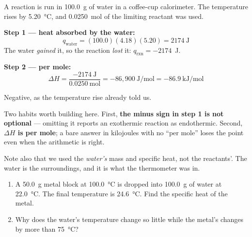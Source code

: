 \documentclass{apchem-notes}
\begin{document}
\begin{workedexample}
A reaction is run in \SI{100.0}{\gram} of water in a coffee-cup
calorimeter. The temperature rises by \SI{5.20}{\celsius}, and
\SI{0.0250}{\mole} of the limiting reactant was used.

\textbf{Step 1 --- heat absorbed by the water:}
\[ q_{\text{water}} = (100.0)(4.18)(5.20) = 2174~\text{J} \]
The water \emph{gained} it, so the reaction \emph{lost} it:
$q_{\text{rxn}} = -2174$~J.

\textbf{Step 2 --- per mole:}
\[ \Delta H = \frac{-2174~\text{J}}{0.0250~\text{mol}}
   = -86{,}900~\si{\joule\per\mole} =
   \mathbf{-86.9}~\si{\kilo\joule\per\mole} \]

Negative, as the temperature rise already told us.
\end{workedexample}

\begin{apctrap}
Two habits worth building here. First, \textbf{the minus sign in step 1 is
not optional} --- omitting it reports an exothermic reaction as
endothermic. Second, \textbf{$\Delta H$ is per mole}; a bare answer in
kilojoules with no ``per mole'' loses the point even when the arithmetic is
right.

Note also that we used the \emph{water's} mass and specific heat, not the
reactants'. The water is the surroundings, and it is what the thermometer
was in.
\end{apctrap}


\begin{enumerate}[leftmargin=*,itemsep=0.4em]
  \item A \SI{50.0}{\gram} metal block at \SI{100.0}{\celsius} is dropped
        into \SI{100.0}{\gram} of water at \SI{22.0}{\celsius}. The final
        temperature is \SI{24.6}{\celsius}. Find the specific heat of the
        metal. \workspace[3cm]
  \item Why does the water's temperature change so little while the metal's
        changes by more than \SI{75}{\celsius}?
\end{enumerate}
\end{document}
